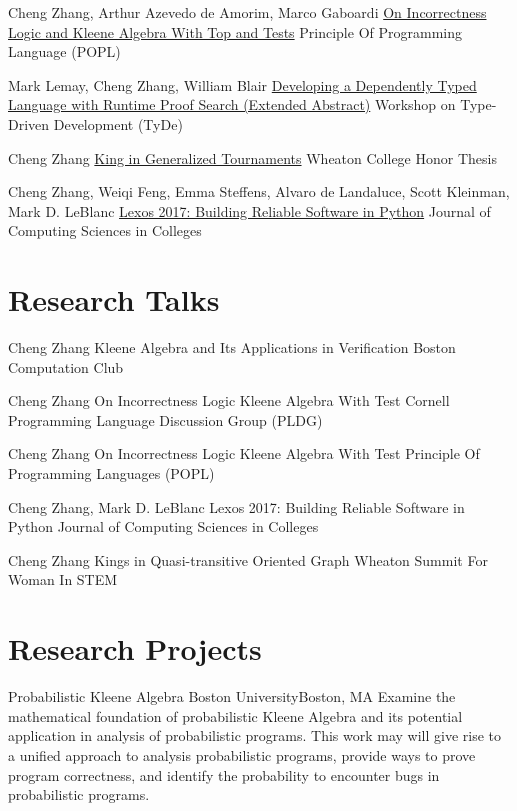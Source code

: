 \documentclass[11pt,roman]{moderncv}        %
\begin{document}
{Cheng Zhang, Arthur Azevedo de Amorim, Marco Gaboardi}
{\href{https://arxiv.org/abs/2108.07707}{On Incorrectness Logic and Kleene Algebra With Top and Tests}}
{Principle Of Programming Language (POPL)}
{}{}

{Mark Lemay, Cheng Zhang, William Blair}
{\href{https://icfp20.sigplan.org/details/tyde-2020-papers/7/Developing-a-Dependently-Typed-Language-with-Runtime-Proof-Search-Extended-Abstract-}
{Developing a Dependently Typed Language with Runtime Proof Search (Extended Abstract)}}
{Workshop on Type-Driven Development (TyDe)}
{}{}

{Cheng Zhang}
{\href{http://hdl.handle.net/11040/24570}{King in Generalized Tournaments}}
{Wheaton College Honor Thesis}
{}{}

{Cheng Zhang, Weiqi Feng, Emma Steffens, Alvaro de Landaluce, Scott Kleinman, Mark D. LeBlanc}
{\href{https://dl.acm.org/doi/10.5555/3205191.3205205}{Lexos 2017: Building Reliable Software in Python}}
{Journal of Computing Sciences in Colleges}
{}{}


\section{Research Talks}

{Cheng Zhang}
{Kleene Algebra and Its Applications in Verification}
{Boston Computation Club}
{}{}

{Cheng Zhang}
{On Incorrectness Logic Kleene Algebra With Test}
{Cornell Programming Language Discussion Group (PLDG)}
{}{}

{Cheng Zhang}
{On Incorrectness Logic Kleene Algebra With Test}
{Principle Of Programming Languages (POPL)}
{}{}

{Cheng Zhang, Mark D. LeBlanc}
{Lexos 2017: Building Reliable Software in Python}
{Journal of Computing Sciences in Colleges}
{}{}

{Cheng Zhang}
{Kings in Quasi-transitive Oriented Graph}
{Wheaton Summit For Woman In STEM}
{}{}


\section{Research Projects}

{Probabilistic Kleene Algebra}
{Boston University}{Boston, MA}{}
{Examine the mathematical foundation of probabilistic Kleene Algebra 
and its potential application in analysis of probabilistic programs.
This work \iftechnical may \else will \fi 
give rise to a unified approach to analysis probabilistic programs,
provide ways to prove program correctness, 
and identify the probability to encounter bugs in probabilistic programs.}
\end{document}
